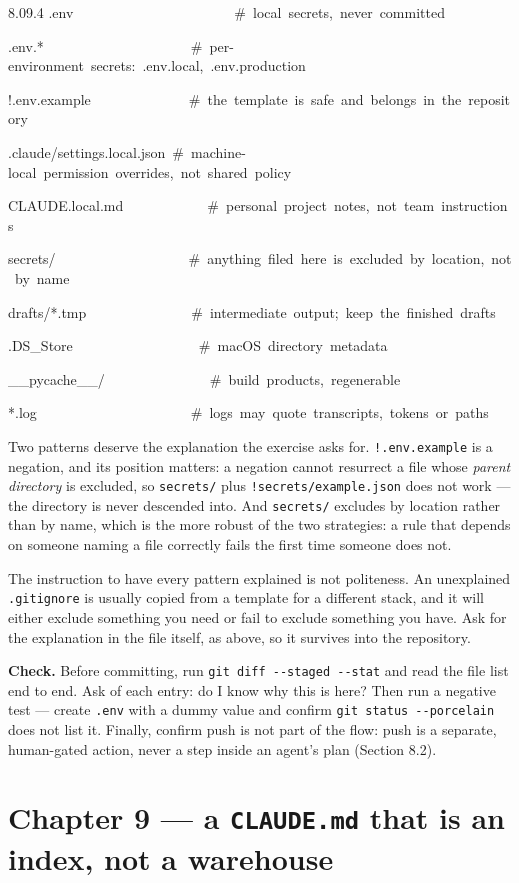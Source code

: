 \documentclass[11pt,a4paper,twoside,openany]{book}
\newcommand{\cl}[1]{\noindent\mbox{#1}\par}
\begin{document}
\begin{codeblock}{8.0}{9.4}
\cl{.env~~~~~~~~~~~~~~~~~~~~~~~\#~local~secrets,~never~committed}
\cl{.env.*~~~~~~~~~~~~~~~~~~~~~\#~per-environment~secrets:~.env.local,~.env.production}
\cl{!.env.example~~~~~~~~~~~~~~\#~the~template~is~safe~and~belongs~in~the~repository}
\cl{.claude/settings.local.json~\#~machine-local~permission~overrides,~not~shared~policy}
\cl{CLAUDE.local.md~~~~~~~~~~~~\#~personal~project~notes,~not~team~instructions}
\cl{secrets/~~~~~~~~~~~~~~~~~~~\#~anything~filed~here~is~excluded~by~location,~not~by~name}
\cl{drafts/*.tmp~~~~~~~~~~~~~~~\#~intermediate~output;~keep~the~finished~drafts}
\cl{.DS\_Store~~~~~~~~~~~~~~~~~~\#~macOS~directory~metadata}
\cl{\_\_pycache\_\_/~~~~~~~~~~~~~~~\#~build~products,~regenerable}
\cl{*.log~~~~~~~~~~~~~~~~~~~~~~\#~logs~may~quote~transcripts,~tokens~or~paths}
\end{codeblock}

Two patterns deserve the explanation the exercise asks for. \texttt{!.\allowbreak{}env.\allowbreak{}example} is a negation, and its position matters: a negation cannot resurrect a file whose \emph{parent directory} is excluded, so \texttt{secrets/\allowbreak{}} plus \texttt{!secrets/\allowbreak{}example.\allowbreak{}json} does not work — the directory is never descended into. And \texttt{secrets/\allowbreak{}} excludes by location rather than by name, which is the more robust of the two strategies: a rule that depends on someone naming a file correctly fails the first time someone does not.


The instruction to have every pattern explained is not politeness. An unexplained \texttt{.\allowbreak{}gitignore} is usually copied from a template for a different stack, and it will either exclude something you need or fail to exclude something you have. Ask for the explanation in the file itself, as above, so it survives into the repository.


\textbf{Check.} Before committing, run \texttt{git diff -\allowbreak{}-\allowbreak{}staged -\allowbreak{}-\allowbreak{}stat} and read the file list end to end. Ask of each entry: do I know why this is here? Then run a negative test — create \texttt{.\allowbreak{}env} with a dummy value and confirm \texttt{git status -\allowbreak{}-\allowbreak{}porcelain} does not list it. Finally, confirm push is not part of the flow: push is a separate, human-gated action, never a step inside an agent's plan (Section 8.2).


\FloatBarrier
\section*{Chapter 9 — a \texttt{CLAUDE.\allowbreak{}md} that is an index, not a warehouse}
\end{document}
